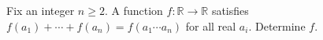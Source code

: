 Fix an integer $n\ge2$. A function $f:\mathbb R\to\mathbb R$ satisfies $f(a_1)+\cdots+f(a_n)=f(a_1\cdots a_n)$ for all real $a_i$. Determine $f$.
